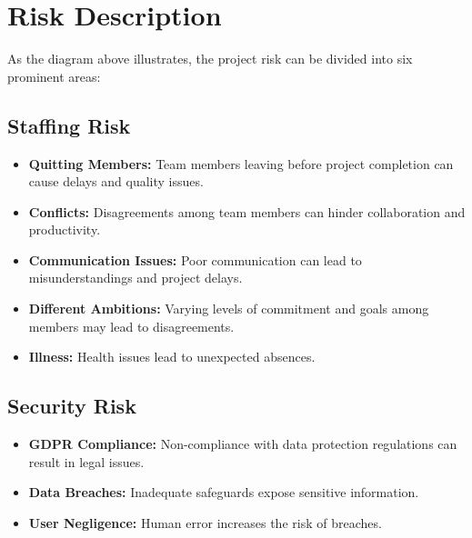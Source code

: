 \documentclass{article}
\begin{document}
\vspace{1 cm}

\pagebreak
\section{Risk Description}

As the diagram above illustrates, the project risk can be divided into six prominent areas:

\vspace{0.5cm}

\subsection{Staffing Risk}
\begin{itemize}
    \item \textbf{Quitting Members:} Team members leaving before project completion can cause delays and quality issues.
    \item \textbf{Conflicts:} Disagreements among team members can hinder collaboration and productivity.
    \item \textbf{Communication Issues:} Poor communication can lead to misunderstandings and project delays.
    \item \textbf{Different Ambitions:} Varying levels of commitment and goals among members may lead to disagreements.
    \item \textbf{Illness:} Health issues lead to unexpected absences.
\end{itemize}

\vspace{0.5cm}

\subsection{Security Risk}
\begin{itemize}
    \item \textbf{GDPR Compliance:} Non-compliance with data protection regulations can result in legal issues.
    \item \textbf{Data Breaches:} Inadequate safeguards expose sensitive information.
    \item \textbf{User Negligence:} Human error increases the risk of breaches.
\end{itemize}

\vspace{0.5cm}
\end{document}
